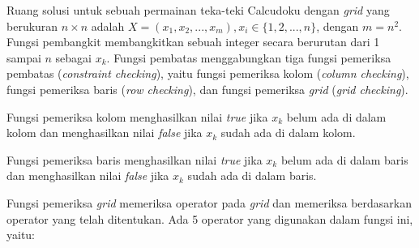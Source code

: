 Ruang solusi untuk sebuah permainan teka-teki Calcudoku dengan \textit{grid} yang berukuran \begin{math}n \times n\end{math} adalah \begin{math}X = (x_1,x_2,...,x_m), x_i \in \{1,2,...,n\}\end{math}, dengan \begin{math}m = n^2\end{math}. Fungsi pembangkit membangkitkan sebuah integer secara berurutan dari 1 sampai \begin{math}n\end{math} sebagai \begin{math}x_k\end{math}. Fungsi pembatas menggabungkan tiga fungsi pemeriksa pembatas (\textit{constraint checking}), yaitu fungsi pemeriksa kolom (\textit{column checking}), fungsi pemeriksa baris (\textit{row checking}), dan fungsi pemeriksa \textit{grid} (\textit{grid checking}).

Fungsi pemeriksa kolom menghasilkan nilai \textit{true} jika \begin{math}x_k\end{math} belum ada di dalam kolom dan menghasilkan nilai \textit{false} jika \begin{math}x_k\end{math} sudah ada di dalam kolom.

Fungsi pemeriksa baris menghasilkan nilai \textit{true} jika \begin{math}x_k\end{math} belum ada di dalam baris dan menghasilkan nilai \textit{false} jika \begin{math}x_k\end{math} sudah ada di dalam baris.

Fungsi pemeriksa \textit{grid} memeriksa operator pada \textit{grid} dan memeriksa berdasarkan operator yang telah ditentukan. Ada 5 operator yang digunakan dalam fungsi ini, yaitu:

